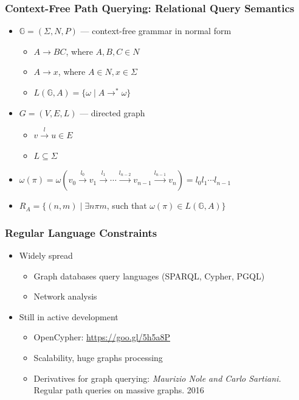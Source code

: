 \documentclass[xcolor=table]{beamer}
\begin{document}
\begin{frame}[fragile]
  \transwipe[direction=90]
  \frametitle{Context-Free Path Querying: Relational Query Semantics}
  \begin{itemize}
    \item $\mathbb{G} = (\Sigma, N, P)$ --- context-free grammar in normal form
    \begin{itemize}
      \item $A \rightarrow B C$, where $A, B, C \in N$
      \item $A \rightarrow x$, where $A \in N, x \in \Sigma$
      \item $L(\mathbb{G},A) = \{ \omega \mid A \rightarrow^* \omega \}$
    \end{itemize}
    \item $G = (V,E,L)$ --- directed graph
      \begin{itemize} 
        \item $v \xrightarrow{l} u \in E$
        \item $L \subseteq \Sigma$
      \end{itemize}
    \item $\omega(\pi) = \omega(v_0 \xrightarrow{l_0} v_1 \xrightarrow{l_1} \cdots \xrightarrow{l_{n-2}} v_{n-1} \xrightarrow{l_{n-1}} v_n) = l_0 l_1 \cdots l_{n-1}$
    \item $R_A = \{ (n, m) \mid \exists n \pi m$, such that $\omega(\pi) \in L(\mathbb{G},A)\}$
  \end{itemize}
\end{frame}

\begin{frame}[fragile]
  \transwipe[direction=90]
  \frametitle{Regular Language Constraints}
  \begin{itemize}
   \item Widely spread
    \begin{itemize}
      \item Graph databases query languages (SPARQL, Cypher, PGQL)
      \item Network analysis
    \end{itemize}  
    \item Still in active development
    \begin{itemize}
      \item OpenCypher: \url{https://goo.gl/5h5a8P}
      \item Scalability, huge graphs processing
      \item Derivatives for graph querying: \emph{Maurizio Nole and Carlo Sartiani.} Regular path queries on massive graphs. 2016
    \end{itemize}   
  \end{itemize}
\end{frame}
\end{document}
